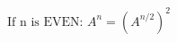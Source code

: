 \documentclass[preview]{standalone}
\begin{document}
\begin{align*}
\text{If n is EVEN: } A^n = (A^{n/2})^2
\end{align*}
\end{document}
